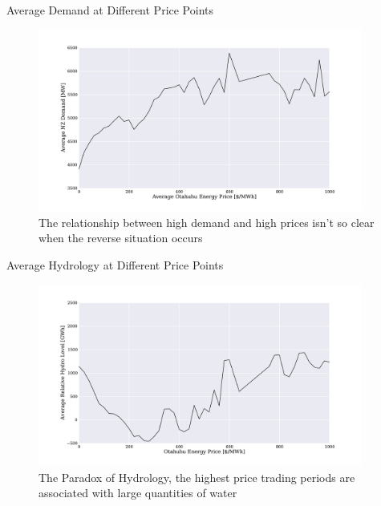 \documentclass[xcolor=x11names,compress]{beamer}
\renewcommand{\(}{\begin{columns}}
\renewcommand{\)}{\end{columns}}
\newcommand{\<}[1]{\begin{column}{#1}}
\renewcommand{\>}{\end{column}}
\begin{document}
\begin{frame}{Average Demand at Different Price Points}
\begin{figure}
\includegraphics[width=0.95\textwidth]{img/demand_and_price.pdf}
\caption{The relationship between high demand and high prices isn't so
clear when the reverse situation occurs}
\end{figure}
\end{frame}

\begin{frame}{Average Hydrology at Different Price Points}
\begin{figure}
\includegraphics[width=0.95\textwidth]{img/hydrology_and_price.pdf}
\caption{The Paradox of Hydrology, the highest price trading periods are
associated with large quantities of water}
\end{figure}
\end{frame}
\end{document}
